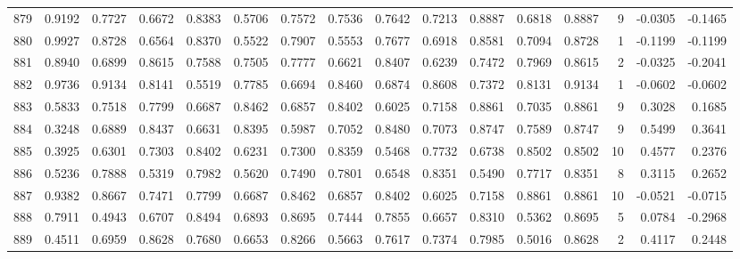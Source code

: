 \begin{tabular}{lrrrrrrrrrrrrrrr}
879 &      0.9192 &  0.7727 &  0.6672 &  0.8383 &  0.5706 &  0.7572 &  0.7536 &  0.7642 &  0.7213 &  0.8887 &   0.6818 &     0.8887 &      9 &                   -0.0305 &                    -0.1465 \\
880 &      0.9927 &  0.8728 &  0.6564 &  0.8370 &  0.5522 &  0.7907 &  0.5553 &  0.7677 &  0.6918 &  0.8581 &   0.7094 &     0.8728 &      1 &                   -0.1199 &                    -0.1199 \\
881 &      0.8940 &  0.6899 &  0.8615 &  0.7588 &  0.7505 &  0.7777 &  0.6621 &  0.8407 &  0.6239 &  0.7472 &   0.7969 &     0.8615 &      2 &                   -0.0325 &                    -0.2041 \\
882 &      0.9736 &  0.9134 &  0.8141 &  0.5519 &  0.7785 &  0.6694 &  0.8460 &  0.6874 &  0.8608 &  0.7372 &   0.8131 &     0.9134 &      1 &                   -0.0602 &                    -0.0602 \\
883 &      0.5833 &  0.7518 &  0.7799 &  0.6687 &  0.8462 &  0.6857 &  0.8402 &  0.6025 &  0.7158 &  0.8861 &   0.7035 &     0.8861 &      9 &                    0.3028 &                     0.1685 \\
884 &      0.3248 &  0.6889 &  0.8437 &  0.6631 &  0.8395 &  0.5987 &  0.7052 &  0.8480 &  0.7073 &  0.8747 &   0.7589 &     0.8747 &      9 &                    0.5499 &                     0.3641 \\
885 &      0.3925 &  0.6301 &  0.7303 &  0.8402 &  0.6231 &  0.7300 &  0.8359 &  0.5468 &  0.7732 &  0.6738 &   0.8502 &     0.8502 &     10 &                    0.4577 &                     0.2376 \\
886 &      0.5236 &  0.7888 &  0.5319 &  0.7982 &  0.5620 &  0.7490 &  0.7801 &  0.6548 &  0.8351 &  0.5490 &   0.7717 &     0.8351 &      8 &                    0.3115 &                     0.2652 \\
887 &      0.9382 &  0.8667 &  0.7471 &  0.7799 &  0.6687 &  0.8462 &  0.6857 &  0.8402 &  0.6025 &  0.7158 &   0.8861 &     0.8861 &     10 &                   -0.0521 &                    -0.0715 \\
888 &      0.7911 &  0.4943 &  0.6707 &  0.8494 &  0.6893 &  0.8695 &  0.7444 &  0.7855 &  0.6657 &  0.8310 &   0.5362 &     0.8695 &      5 &                    0.0784 &                    -0.2968 \\
889 &      0.4511 &  0.6959 &  0.8628 &  0.7680 &  0.6653 &  0.8266 &  0.5663 &  0.7617 &  0.7374 &  0.7985 &   0.5016 &     0.8628 &      2 &                    0.4117 &                     0.2448 \\

\end{tabular}
